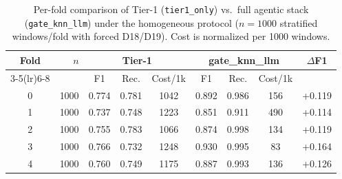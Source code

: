 \begin{table}[!t]
\centering
\caption{Per-fold comparison of Tier-1 (\texttt{tier1\_only}) vs.\ full agentic stack (\texttt{gate\_knn\_llm}) under the homogeneous protocol ($n{=}1000$ stratified windows/fold with forced D18/D19). Cost is normalized per 1000 windows.}
\label{tab:perfold}
\begin{tabular}{c r ccc ccc c}
\toprule
Fold & $n$ & \multicolumn{3}{c}{Tier-1} & \multicolumn{3}{c}{gate\_knn\_llm} & $\Delta$F1 \\
\cmidrule(lr){3-5}\cmidrule(lr){6-8}
 & & F1 & Rec. & Cost/1k & F1 & Rec. & Cost/1k & \\
\midrule
0 & 1000 & 0.774 & 0.781 & 1042 & 0.892 & 0.986 & 156 & +0.119 \\
1 & 1000 & 0.737 & 0.748 & 1223 & 0.851 & 0.911 & 490 & +0.114 \\
2 & 1000 & 0.755 & 0.783 & 1066 & 0.874 & 0.998 & 134 & +0.119 \\
3 & 1000 & 0.766 & 0.732 & 1248 & 0.930 & 0.995 & 83 & +0.164 \\
4 & 1000 & 0.760 & 0.749 & 1175 & 0.887 & 0.993 & 136 & +0.126 \\
\bottomrule
\end{tabular}
\end{table}
